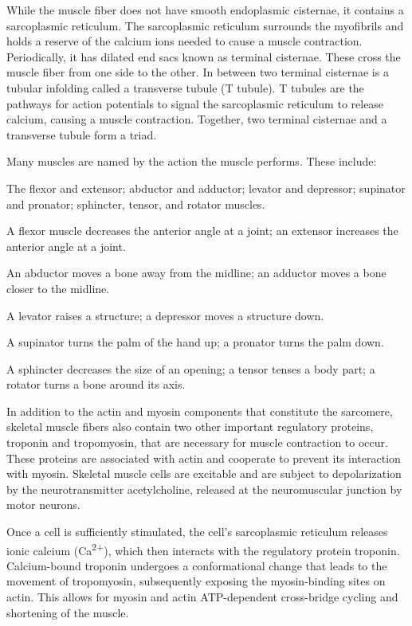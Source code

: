 While the muscle fiber does not have smooth endoplasmic cisternae, it contains a sarcoplasmic reticulum. The sarcoplasmic reticulum surrounds the myofibrils and holds a reserve of the calcium ions needed to cause a muscle contraction. Periodically, it has dilated end sacs known as terminal cisternae. These cross the muscle fiber from one side to the other. In between two terminal cisternae is a tubular infolding called a transverse tubule (T tubule). T tubules are the pathways for action potentials to signal the sarcoplasmic reticulum to release calcium, causing a muscle contraction. Together, two terminal cisternae and a transverse tubule form a triad.

Many muscles are named by the action the muscle performs. These include:

The flexor and extensor; abductor and adductor; levator and depressor; supinator and pronator; sphincter, tensor, and rotator muscles.

A flexor muscle decreases the anterior angle at a joint; an extensor increases the anterior angle at a joint.

An abductor moves a bone away from the midline; an adductor moves a bone closer to the midline.

A levator raises a structure; a depressor moves a structure down.

A supinator turns the palm of the hand up; a pronator turns the palm down.

A sphincter decreases the size of an opening; a tensor tenses a body part; a rotator turns a bone around its axis.

In addition to the actin and myosin components that constitute the sarcomere, skeletal muscle fibers also contain two other important regulatory proteins, troponin and tropomyosin, that are necessary for muscle contraction to occur. These proteins are associated with actin and cooperate to prevent its interaction with myosin. Skeletal muscle cells are excitable and are subject to depolarization by the neurotransmitter acetylcholine, released at the neuromuscular junction by motor neurons.

Once a cell is sufficiently stimulated, the cell's sarcoplasmic reticulum releases ionic calcium (Ca\textsuperscript{2+}), which then interacts with the regulatory protein troponin. Calcium-bound troponin undergoes a conformational change that leads to the movement of tropomyosin, subsequently exposing the myosin-binding sites on actin. This allows for myosin and actin ATP-dependent cross-bridge cycling and shortening of the muscle.

